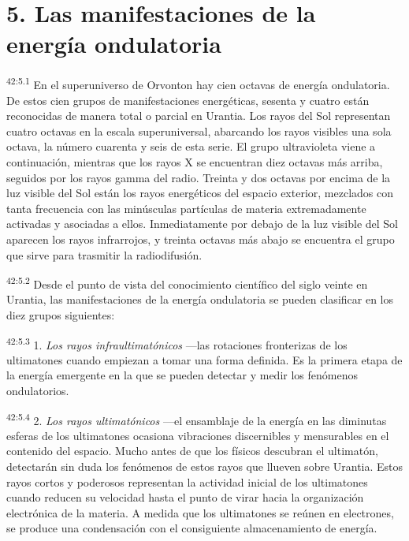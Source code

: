 \section*{5. Las manifestaciones de la energía ondulatoria}
\par
\textsuperscript{42:5.1} En el superuniverso de Orvonton hay cien octavas de energía ondulatoria. De estos cien grupos de manifestaciones energéticas, sesenta y cuatro están reconocidas de manera total o parcial en Urantia. Los rayos del Sol representan cuatro octavas en la escala superuniversal, abarcando los rayos visibles una sola octava, la número cuarenta y seis de esta serie. El grupo ultravioleta viene a continuación, mientras que los rayos X se encuentran diez octavas más arriba, seguidos por los rayos gamma del radio. Treinta y dos octavas por encima de la luz visible del Sol están los rayos energéticos del espacio exterior, mezclados con tanta frecuencia con las minúsculas partículas de materia extremadamente activadas y asociadas a ellos. Inmediatamente por debajo de la luz visible del Sol aparecen los rayos infrarrojos, y treinta octavas más abajo se encuentra el grupo que sirve para trasmitir la radiodifusión.

\par
\textsuperscript{42:5.2} Desde el punto de vista del conocimiento científico del siglo veinte en Urantia, las manifestaciones de la energía ondulatoria se pueden clasificar en los diez grupos siguientes:

\par
\textsuperscript{42:5.3} 1. \textit{Los rayos infraultimatónicos} ---las rotaciones fronterizas de los ultimatones cuando empiezan a tomar una forma definida. Es la primera etapa de la energía emergente en la que se pueden detectar y medir los fenómenos ondulatorios.

\par
\textsuperscript{42:5.4} 2. \textit{Los rayos ultimatónicos} ---el ensamblaje de la energía en las diminutas esferas de los ultimatones ocasiona vibraciones discernibles y mensurables en el contenido del espacio. Mucho antes de que los físicos descubran el ultimatón, detectarán sin duda los fenómenos de estos rayos que llueven sobre Urantia. Estos rayos cortos y poderosos representan la actividad inicial de los ultimatones cuando reducen su velocidad hasta el punto de virar hacia la organización electrónica de la materia. A medida que los ultimatones se reúnen en electrones, se produce una condensación con el consiguiente almacenamiento de energía.

